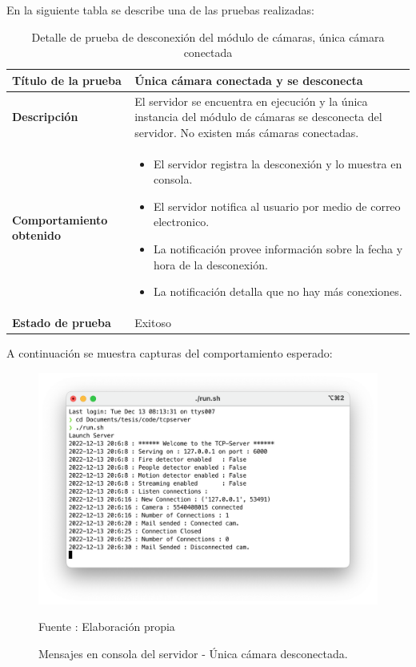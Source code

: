 En la siguiente tabla se describe una de las pruebas realizadas:

\begin{table}[H]
    \caption{Detalle de prueba de desconexión del módulo de cámaras, única cámara conectada}
    \begin{center}
        \begin{tabular}{|>{\centering}p{}|m{}<{\centering}|} 
            \hline
            \textbf{Título de la prueba} & Única cámara conectada y se desconecta \\
            \hline
            \textbf{Descripción} & El servidor se encuentra en ejecución y la única instancia del módulo de cámaras se desconecta del servidor. No existen más cámaras conectadas.\\
            \hline
            \textbf{Comportamiento obtenido} & 
            \begin{itemize}
                \item El servidor registra la desconexión y lo muestra en consola.
                \item El servidor notifica al usuario por medio de correo electronico.
                \item La notificación provee información sobre la fecha y hora de la desconexión.
                \item La notificación detalla que no hay más conexiones.
            \end{itemize} \\ 
            \hline
            \textbf{Estado de prueba} & Exitoso \\
            \hline
        \end{tabular}
    \end{center}
\end{table}

A continuación se muestra capturas del comportamiento esperado:

\begin{figure}[H]
    \begin{center}
        \includegraphics[width=12cm]{img/capitulo_6/cam_disconnected_1_cam.png}
    \end{center}
    \begin{center}
        \caption{Mensajes en consola del servidor - Única cámara desconectada.}
        Fuente : Elaboración propia
    \end{center}
\end{figure}

